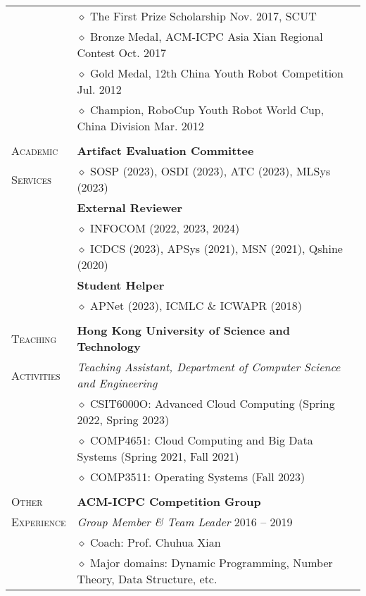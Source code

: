 \documentclass[letterpaper, 11pt]{article}
\begin{document}
\begin{longtable}{p{1in}p{5in}}
& $\diamond$ The First Prize Scholarship \hfill Nov. 2017, SCUT \\

& $\diamond$ Bronze Medal, ACM-ICPC Asia Xian Regional Contest \hfill Oct. 2017 \\

& $\diamond$ Gold Medal, 12th China Youth Robot Competition \hfill Jul. 2012 \\

& $\diamond$ Champion, RoboCup Youth Robot World Cup, China Division \hfill Mar. 2012 \\

& \\

{\textsc{Academic}}
& \textbf{Artifact Evaluation Committee} \\
{\textsc{Services}}
& $\diamond$ SOSP (2023), OSDI (2023), ATC (2023), MLSys (2023) \\
& \textbf{External Reviewer} \\
& $\diamond$ INFOCOM (2022, 2023, 2024) \\
& $\diamond$ ICDCS (2023), APSys (2021), MSN (2021), Qshine (2020) \\
& \textbf{Student Helper} \\
& $\diamond$ APNet (2023), ICMLC \& ICWAPR (2018) \\
& \\

{\textsc{Teaching }}
& \textbf{Hong Kong University of Science and Technology} \\
{\textsc{Activities}}
& \textit{Teaching Assistant, Department of Computer Science and Engineering} \\
& $\diamond$ CSIT6000O: Advanced Cloud Computing (Spring 2022, Spring 2023) \\
& $\diamond$ COMP4651: Cloud Computing and Big Data Systems (Spring 2021, Fall 2021) \\
& $\diamond$ COMP3511: Operating Systems (Fall 2023) \\
& \\

{\textsc{Other}}
& \textbf{ACM-ICPC Competition Group} \\
{\textsc{Experience}}
& \textit{Group Member \& Team Leader} \hfill 2016 -- 2019 \\
& $\diamond$ Coach: Prof. Chuhua Xian \\
& $\diamond$ Major domains: Dynamic Programming, Number Theory, Data Structure, etc. \\


\end{longtable}
\end{document}
